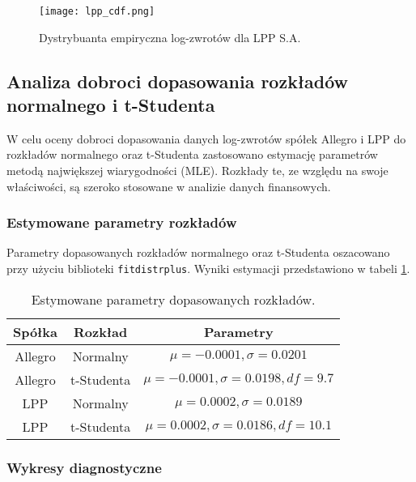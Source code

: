 \documentclass[12pt]{article}
\begin{document}
\begin{figure}[H]
    \centering
    \texttt{[image: lpp\_cdf.png]}
    \caption{Dystrybuanta empiryczna log-zwrotów dla LPP S.A.}
    \label{fig:lpp_cdf}
\end{figure}


\subsection{Analiza dobroci dopasowania rozkładów normalnego i t-Studenta}

W celu oceny dobroci dopasowania danych log-zwrotów spółek Allegro i LPP do rozkładów normalnego oraz t-Studenta zastosowano estymację parametrów metodą największej wiarygodności (MLE). Rozkłady te, ze względu na swoje właściwości, są szeroko stosowane w analizie danych finansowych. 

\subsubsection{Estymowane parametry rozkładów}

Parametry dopasowanych rozkładów normalnego oraz t-Studenta oszacowano przy użyciu biblioteki \texttt{fitdistrplus}. Wyniki estymacji przedstawiono w tabeli \ref{tab:fit_params}.

\begin{table}[H]
\centering
\begin{tabular}{|c|c|c|}
\hline
Spółka & Rozkład & Parametry \\ \hline
Allegro & Normalny & $\mu = -0.0001, \sigma = 0.0201$ \\ 
Allegro & t-Studenta & $\mu = -0.0001, \sigma = 0.0198, df = 9.7$ \\ 
LPP     & Normalny & $\mu = 0.0002, \sigma = 0.0189$ \\ 
LPP     & t-Studenta & $\mu = 0.0002, \sigma = 0.0186, df = 10.1$ \\ \hline
\end{tabular}
\caption{Estymowane parametry dopasowanych rozkładów.}
\label{tab:fit_params}
\end{table}

\subsubsection{Wykresy diagnostyczne}
\end{document}
